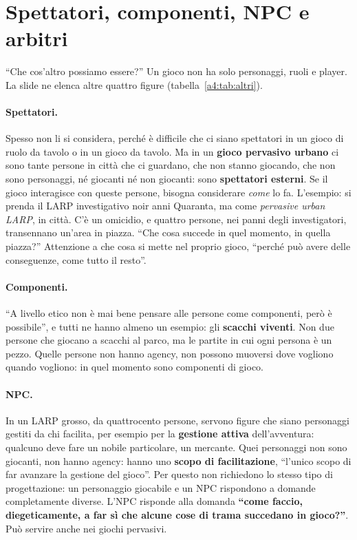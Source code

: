 \section{Spettatori, componenti, NPC e arbitri}
\label{a4:sec:altri}

``Che cos'altro possiamo essere?'' Un gioco non ha solo personaggi, ruoli e player.
La slide ne elenca altre quattro figure (tabella~\ref{a4:tab:altri}).

\paragraph{Spettatori.} Spesso non li si considera, perché è difficile che ci siano
spettatori in un gioco di ruolo da tavolo o in un gioco da tavolo. Ma in un
\textbf{gioco pervasivo urbano} ci sono tante persone in città che ci guardano, che
non stanno giocando, che non sono personaggi, né giocanti né non giocanti: sono
\textbf{spettatori esterni}. Se il gioco interagisce con queste persone, bisogna
considerare \emph{come} lo fa. L'esempio: si prenda il LARP investigativo noir anni
Quaranta, ma come \emph{pervasive urban LARP}, in città. C'è un omicidio, e quattro
persone, nei panni degli investigatori, transennano un'area in piazza. ``Che cosa
succede in quel momento, in quella piazza?'' Attenzione a che cosa si mette nel
proprio gioco, ``perché può avere delle conseguenze, come tutto il resto''.

\paragraph{Componenti.} ``A livello etico non è mai bene pensare alle persone come
componenti, però è possibile'', e tutti ne hanno almeno un esempio: gli
\textbf{scacchi viventi}. Non due persone che giocano a scacchi al parco, ma le
partite in cui ogni persona è un pezzo. Quelle persone non hanno agency, non possono
muoversi dove vogliono quando vogliono: in quel momento sono componenti di gioco.

\paragraph{NPC.} In un LARP grosso, da quattrocento persone, servono figure che
siano personaggi gestiti da chi facilita, per esempio per la \textbf{gestione
attiva} dell'avventura: qualcuno deve fare un nobile particolare, un mercante. Quei
personaggi non sono giocanti, non hanno agency: hanno uno \textbf{scopo di
facilitazione}, ``l'unico scopo di far avanzare la gestione del gioco''. Per questo
non richiedono lo stesso tipo di progettazione: un personaggio giocabile e un NPC
rispondono a domande completamente diverse. L'NPC risponde alla domanda
\textbf{``come faccio, diegeticamente, a far sì che alcune cose di trama succedano
in gioco?''}. Può servire anche nei giochi pervasivi.

